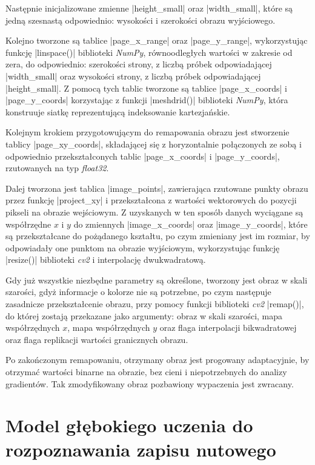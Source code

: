 Następnie inicjalizowane zmienne \pyth|height_small| oraz \pyth|width_small|, które są jedną szesnastą odpowiednio: wysokości i szerokości obrazu wyjściowego.

Kolejno tworzone są tablice \pyth|page_x_range| oraz \pyth|page_y_range|, wykorzystując funkcję \pyth|linspace()| biblioteki \textit{NumPy}, równoodległych wartości w zakresie od zera, do odpowiednio: szerokości strony, z liczbą próbek odpowiadającej \pyth|width_small| oraz wysokości strony, z liczbą próbek odpowiadającej \pyth|height_small|. Z pomocą tych tablic tworzone są tablice \pyth|page_x_coords| i \pyth|page_y_coords| korzystając z funkcji \pyth|meshdrid()| biblioteki \textit{NumPy}, która konstruuje siatkę reprezentującą indeksowanie kartezjańskie.

Kolejnym krokiem przygotowującym do remapowania obrazu jest stworzenie tablicy \pyth|page_xy_coords|, składającej się z horyzontalnie połączonych ze sobą i odpowiednio przekształconych tablic \pyth|page_x_coords| i \pyth|page_y_coords|, rzutowanych na typ \textit{float32}.

Dalej tworzona jest tablica \pyth|image_points|, zawierająca rzutowane punkty obrazu przez funkcję \pyth|project_xy| i przekształcona z wartości wektorowych do pozycji pikseli na obrazie wejściowym. Z uzyskanych w ten sposób danych wyciągane są współrzędne $x$ i $y$ do zmiennych \pyth|image_x_coords| oraz \pyth|image_y_coords|, które są przekształcane do pożądanego kształtu, po czym zmieniany jest im rozmiar, by odpowiadały one punktom na obrazie wyjściowym, wykorzystując funkcję \pyth|resize()| biblioteki \textit{cv2} i interpolację dwukwadratową.

Gdy już wszystkie niezbędne parametry są określone, tworzony jest obraz w skali szarości, gdyż informacje o kolorze nie są potrzebne, po czym następuje zasadnicze przekształcenie obrazu, przy pomocy funkcji biblioteki \textit{cv2} \pyth|remap()|, do której zostają przekazane jako argumenty: obraz w skali szarości, mapa współrzędnych $x$, mapa współrzędnych $y$ oraz flaga interpolacji bikwadratowej oraz flaga replikacji wartości granicznych obrazu.

Po zakończonym remapowaniu, otrzymany obraz jest progowany adaptacyjnie, by otrzymać wartości binarne na obrazie, bez cieni i niepotrzebnych do analizy gradientów. Tak zmodyfikowany obraz pozbawiony wypaczenia jest zwracany.


\section{Model głębokiego uczenia do rozpoznawania zapisu nutowego}


















